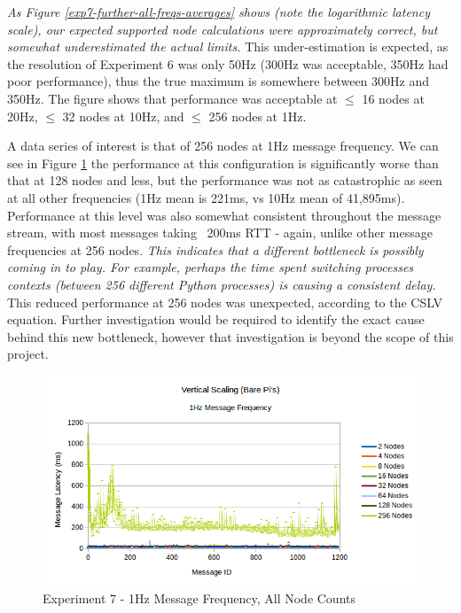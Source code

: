 \documentclass[../dissertation.tex]{subfiles}
\begin{document}
\textit{As Figure \ref{exp7-further-all-freqs-averages} shows (note the logarithmic latency scale), our expected supported node calculations were approximately correct, but somewhat underestimated the actual limits.} This under-estimation is expected, as the resolution of Experiment 6 was only 50Hz (300Hz was acceptable, 350Hz had poor performance), thus the true maximum is somewhere between 300Hz and 350Hz. The figure shows that performance was acceptable at $\leq$ 16 nodes at 20Hz, $\leq$ 32 nodes at 10Hz, and $\leq$ 256 nodes at 1Hz.

A data series of interest is that of 256 nodes at 1Hz message frequency. We can see in Figure \ref{exp7-further-1hz-all-nodes} the performance at this configuration is significantly worse than that at 128 nodes and less, but the performance was not as catastrophic as seen at all other frequencies (1Hz mean is 221ms, vs 10Hz mean of 41,895ms). Performance at this level was also somewhat consistent throughout the message stream, with most messages taking ~200ms RTT - again, unlike other message frequencies at 256 nodes. \textit{This indicates that a different bottleneck is possibly coming in to play. For example, perhaps the time spent switching processes contexts (between 256 different Python processes) is causing a consistent delay.} This reduced performance at 256 nodes was unexpected, according to the CSLV equation. Further investigation would be required to identify the exact cause behind this new bottleneck, however that investigation is beyond the scope of this project.

\begin{figure}[H]
\centering
\includegraphics[width=\textwidth]{images/experiment8/vertical_scaling_1hz_all_node_counts.png}
\caption{Experiment 7 - 1Hz Message Frequency, All Node Counts}
\label{exp7-further-1hz-all-nodes}
\end{figure}
\end{document}
